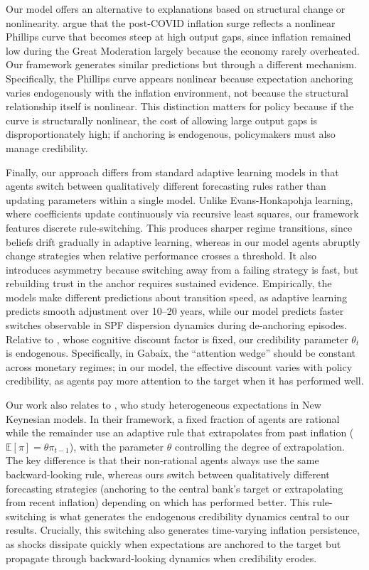 \documentclass[10pt]{article}
\begin{document}
Our model offers an alternative to explanations based on structural change or nonlinearity. \citet{benigno2023baaack} argue that the post-COVID inflation surge reflects a nonlinear Phillips curve that becomes steep at high output gaps, since inflation remained low during the Great Moderation largely because the economy rarely overheated. Our framework generates similar predictions but through a different mechanism. Specifically, the Phillips curve appears nonlinear because expectation anchoring varies endogenously with the inflation environment, not because the structural relationship itself is nonlinear. This distinction matters for policy because if the curve is structurally nonlinear, the cost of allowing large output gaps is disproportionately high; if anchoring is endogenous, policymakers must also manage credibility.

Finally, our approach differs from standard adaptive learning models \citep{evans2001learning, orphanides2005imperfect} in that agents switch between qualitatively different forecasting rules rather than updating parameters within a single model. Unlike Evans-Honkapohja learning, where coefficients update continuously via recursive least squares, our framework features discrete rule-switching. This produces sharper regime transitions, since beliefs drift gradually in adaptive learning, whereas in our model agents abruptly change strategies when relative performance crosses a threshold. It also introduces asymmetry because switching away from a failing strategy is fast, but rebuilding trust in the anchor requires sustained evidence. Empirically, the models make different predictions about transition speed, as adaptive learning predicts smooth adjustment over 10--20 years, while our model predicts faster switches observable in SPF dispersion dynamics during de-anchoring episodes. Relative to \citet{gabaix2020}, whose cognitive discount factor is fixed, our credibility parameter $\theta_t$ is endogenous. Specifically, in Gabaix, the ``attention wedge'' should be constant across monetary regimes; in our model, the effective discount varies with policy credibility, as agents pay more attention to the target when it has performed well. 

Our work also relates to \citet{branch2009}, who study heterogeneous expectations in New Keynesian models. In their framework, a fixed fraction of agents are rational while the remainder use an adaptive rule that extrapolates from past inflation ($\mathbb{E}[\pi] = \theta\pi_{t-1}$), with the parameter $\theta$ controlling the degree of extrapolation. The key difference is that their non-rational agents always use the same backward-looking rule, whereas ours switch between qualitatively different forecasting strategies (anchoring to the central bank's target or extrapolating from recent inflation) depending on which has performed better. This rule-switching is what generates the endogenous credibility dynamics central to our results. Crucially, this switching also generates time-varying inflation persistence, as shocks dissipate quickly when expectations are anchored to the target but propagate through backward-looking dynamics when credibility erodes. 
\end{document}
